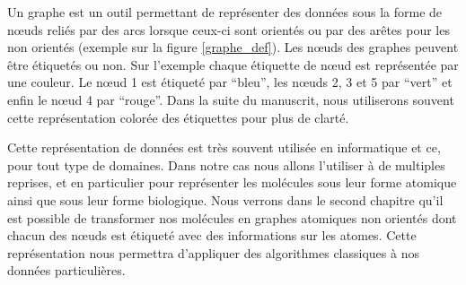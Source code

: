 Un graphe est un outil permettant de représenter des données sous la forme de n\oe{}uds reliés par des arcs lorsque ceux-ci sont orientés ou par des arêtes pour les non orientés (exemple sur la figure \ref{graphe_def}).
Les n\oe{}uds des graphes peuvent être étiquetés ou non.
Sur l'exemple chaque étiquette de n\oe{}ud est représentée par une couleur.
Le n\oe{}ud 1 est étiqueté par ``bleu'', les n\oe{}uds 2, 3 et 5 par ``vert'' et enfin le n\oe{}ud 4 par ``rouge''.
Dans la suite du manuscrit, nous utiliserons souvent cette représentation colorée des étiquettes pour plus de clarté.

Cette représentation de données est très souvent utilisée en informatique et ce, pour tout type de domaines.
Dans notre cas nous allons l'utiliser à de multiples reprises, et en particulier pour représenter les molécules sous leur forme atomique ainsi que sous leur forme biologique.
Nous verrons dans le second chapitre qu'il est possible de transformer nos molécules en graphes atomiques non orientés dont chacun des n\oe{}uds est étiqueté avec des informations sur les atomes.
Cette représentation nous permettra d'appliquer des algorithmes classiques à nos données particulières.





























